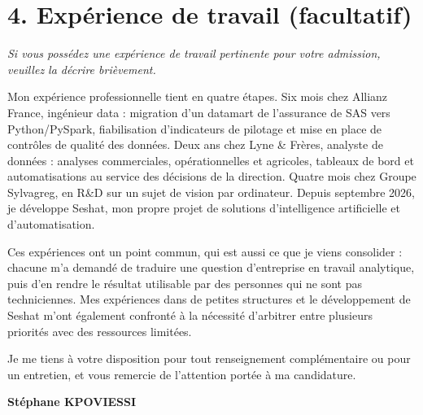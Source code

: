 \documentclass[12pt,a4paper]{article}
\begin{document}
\newpage
\section{4. Expérience de travail (facultatif)}
{\itshape\footnotesize Si vous possédez une expérience de travail pertinente pour votre admission, veuillez la décrire brièvement.}\par
\vspace{0.35em}

Mon expérience professionnelle tient en quatre étapes. Six mois chez Allianz France, ingénieur data : migration d'un datamart de l'assurance de SAS vers Python/PySpark, fiabilisation d'indicateurs de pilotage et mise en place de contrôles de qualité des données. Deux ans chez Lyne \& Frères, analyste de données : analyses commerciales, opérationnelles et agricoles, tableaux de bord et automatisations au service des décisions de la direction. Quatre mois chez Groupe Sylvagreg, en R\&D sur un sujet de vision par ordinateur. Depuis septembre 2026, je développe Seshat, mon propre projet de solutions d'intelligence artificielle et d'automatisation.

Ces expériences ont un point commun, qui est aussi ce que je viens consolider : chacune m'a demandé de traduire une question d'entreprise en travail analytique, puis d'en rendre le résultat utilisable par des personnes qui ne sont pas techniciennes. Mes expériences dans de petites structures et le développement de Seshat m'ont également confronté à la nécessité d'arbitrer entre plusieurs priorités avec des ressources limitées.

\vspace{0.9em}
Je me tiens à votre disposition pour tout renseignement complémentaire ou pour un entretien, et vous remercie de l'attention portée à ma candidature.

\vspace{1em}
{\bfseries Stéphane KPOVIESSI}
\end{document}
